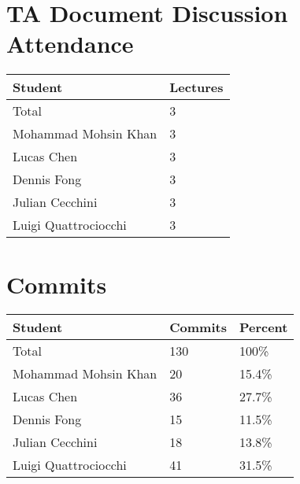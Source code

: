 \documentclass{article}
\begin{document}
\section{TA Document Discussion Attendance}

\begin{table}[H]
\centering
\begin{tabular}{ll}
\toprule
\textbf{Student} & \textbf{Lectures}\\
\midrule
Total & 3\\
Mohammad Mohsin Khan & 3\\
Lucas Chen & 3\\
Dennis Fong & 3\\
Julian Cecchini & 3\\
Luigi Quattrociocchi & 3\\
\bottomrule
\end{tabular}
\end{table}

\section{Commits}


\begin{table}[H]
\centering
\begin{tabular}{lll}
\toprule
\textbf{Student} & \textbf{Commits} & \textbf{Percent}\\
\midrule
Total & 130 & 100\% \\
Mohammad Mohsin Khan & 20 & 15.4\% \\
Lucas Chen & 36 & 27.7\% \\
Dennis Fong & 15 & 11.5\% \\
Julian Cecchini & 18 & 13.8\% \\
Luigi Quattrociocchi & 41 & 31.5\% \\
\bottomrule
\end{tabular}
\end{table}

\end{document}
